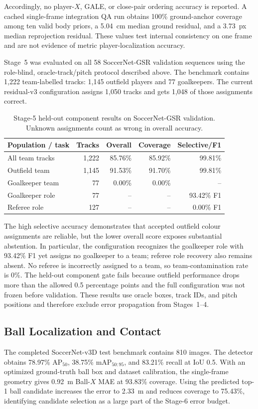 \documentclass[runningheads]{llncs}
\begin{document}
Accordingly, no player-$X$, GALE, or close-pair ordering accuracy is reported. A cached single-frame integration QA run obtains 100\% ground-anchor coverage among ten valid body priors, a 5.04~cm median ground residual, and a 3.73~px median reprojection residual. These values test internal consistency on one frame and are not evidence of metric player-localization accuracy.

Stage~5 was evaluated on all 58 SoccerNet-GSR validation sequences using the role-blind, oracle-track/pitch protocol described above. The benchmark contains 1,222 team-labelled tracks: 1,145 outfield players and 77 goalkeepers. The current residual-v3 configuration assigns 1,050 tracks and gets 1,048 of those assignments correct.

\begin{table}[H]
\centering
\caption{Stage-5 held-out component results on SoccerNet-GSR validation. Unknown assignments count as wrong in overall accuracy.}
\label{tab:team_results}
\small
\begin{tabular}{lrrrr}
\toprule
Population / task & Tracks & Overall & Coverage & Selective/F1 \\
\midrule
All team tracks & 1,222 & 85.76\% & 85.92\% & 99.81\% \\
Outfield team & 1,145 & 91.53\% & 91.70\% & 99.81\% \\
Goalkeeper team & 77 & 0.00\% & 0.00\% & -- \\
Goalkeeper role & 77 & -- & -- & 93.42\% F1 \\
Referee role & 127 & -- & -- & 0.00\% F1 \\
\bottomrule
\end{tabular}
\end{table}

The high selective accuracy demonstrates that accepted outfield colour assignments are reliable, but the lower overall score exposes substantial abstention. In particular, the configuration recognizes the goalkeeper role with 93.42\% F1 yet assigns no goalkeeper to a team; referee role recovery also remains absent. No referee is incorrectly assigned to a team, so team-contamination rate is 0\%. The held-out component gate fails because outfield performance drops more than the allowed 0.5 percentage points and the full configuration was not frozen before validation. These results use oracle boxes, track IDs, and pitch positions and therefore exclude error propagation from Stages~1--4.

\subsection{Ball Localization and Contact}
\label{subsec:results_ball}
The completed SoccerNet-v3D test benchmark contains 810 images. The detector obtains 78.97\% AP$_{50}$, 38.75\% mAP$_{50:95}$, and 83.21\% recall at IoU 0.5. With an optimized ground-truth ball box and dataset calibration, the single-frame geometry gives 0.92~m Ball-$X$ MAE at 93.83\% coverage. Using the predicted top-1 ball candidate increases the error to 2.33~m and reduces coverage to 75.43\%, identifying candidate selection as a large part of the Stage-6 error budget.
\end{document}
